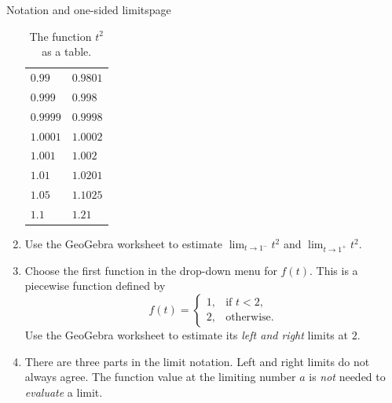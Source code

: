 \documentclass[../main.tex]{subfiles}
\begin{document}
\begin{outline}{2.2}{Notation and one-sided limits}{page}
\begin{enumerate}
\begin{table}[h]
\begin{tabular}{l | l}
              \(0.99\)   & \(0.9801\) \\
              \(0.999\)  & \(0.998\)  \\
              \(0.9999\) & \(0.9998\) \\
              \(1.0001\) & \(1.0002\) \\
              \(1.001\)  & \(1.002\)  \\
              \(1.01\)   & \(1.0201\) \\
              \(1.05\)   & \(1.1025\) \\
              \(1.1\)    & \(1.21\)   \\
            \end{tabular}
            \label{table:limits_introduction}
            \caption{The function \(t^{2}\) as a table.}
          \end{table}
    \item Use the GeoGebra worksheet to estimate \(\lim_{t \to 1^{-}} t^{2}\) and \(\lim_{t \to 1^{+}} t^{2}\).
    \item \label{part:piecewise} Choose the first function in the drop-down menu for \(f(t)\). This is a piecewise function defined by
          \[
            f(t) =
            \begin{cases}
              1, & \text{if } t < 2, \\
              2, & \text{otherwise}.
            \end{cases}
          \]
          Use the GeoGebra worksheet to estimate its \emph{left and right} limits at \(2\). %
    \item There are three parts in the limit notation. Left and right limits do not always agree. The function value at the limiting number \(a\) is \emph{not} needed to \emph{evaluate} a limit.
  \end{enumerate}
\end{outline}
\end{document}
